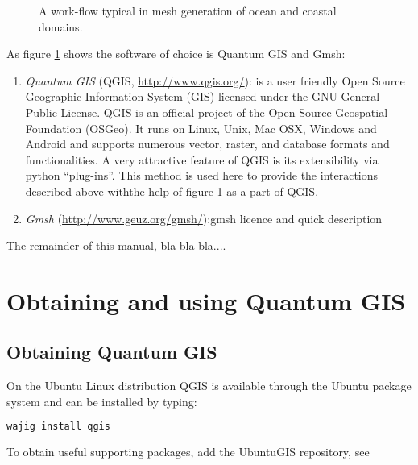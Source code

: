 \begin{figure}[htb!]\begin{center}
\caption[The usual meshing workflow.]{A work-flow typical in mesh generation of ocean and coastal domains.}
\label{fig:main_components}
\end{center}\end{figure}
\par
As figure \ref{fig:main_components} shows the software of choice is Quantum GIS and Gmsh:
\begin{enumerate}
  \item{\emph{Quantum GIS} (QGIS, \url{http://www.qgis.org/}):} is a user friendly Open Source Geographic Information System (GIS) licensed under the GNU General Public License. QGIS is an official project of the Open Source Geospatial Foundation (OSGeo). It runs on Linux, Unix, Mac OSX, Windows and Android and supports numerous vector, raster, and database formats and functionalities. A very attractive feature of QGIS is its extensibility via python ``plug-ins''. This method is used here to provide the interactions described above withthe help of figure \ref{fig:main_components} as a part of QGIS.
  \item{\emph{Gmsh} (\url{http://www.geuz.org/gmsh/}):gmsh licence and quick description}
\end{enumerate}
The remainder of this manual, bla bla bla....



\section{Obtaining and using Quantum GIS}
\label{sect:obtaining_and_using_qgis}

\subsection{Obtaining Quantum GIS}
\label{sec:install}
On the Ubuntu Linux distribution {Q}{G}{I}{S} is available through the Ubuntu package system and can be installed by typing: 

\begin{example}
\begin{lstlisting}[language=bash]
  wajig install qgis
\end{lstlisting}
\end{example}

To obtain useful supporting packages, add the UbuntuGIS repository,  see

